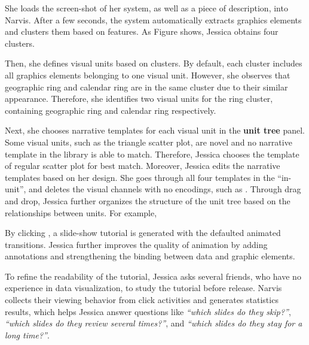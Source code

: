 She loads the screen-shot of her system, as well as a piece of description, into Narvis.
After a few seconds, the system automatically extracts graphics elements and clusters them based on features. As Figure shows, Jessica obtains four clusters. 

Then, she defines visual units based on clusters. By default, each cluster includes all graphics elements belonging to one visual unit. However, she observes that geographic ring and calendar ring are in the same cluster due to their similar appearance. Therefore, she identifies two visual units for the ring cluster, containing geographic ring and calendar ring respectively.

Next, she chooses narrative templates for each visual unit in the \textbf{unit tree} panel. Some visual units, such as the triangle scatter plot, are novel and no narrative template in the library is able to match. Therefore, Jessica chooses the template of regular scatter plot for best match.
Moreover, Jessica edits the narrative templates based on her design. 
She goes through all four templates in the ``in-unit'', and deletes the visual channels with no encodings, such as . 
Through drag and drop, Jessica further organizes the structure of the unit tree based on the relationships between units. For example, 

By clicking , a slide-show tutorial is generated with the defaulted animated transitions. Jessica further improves the quality of animation by adding annotations and strengthening the binding between data and graphic elements. 


To refine the readability of the tutorial, Jessica asks several friends, who have no experience in data visualization, to study the tutorial before release. Narvis collects their viewing behavior from click activities and generates statistics results, which helps Jessica answer questions like \textit{``which slides do they skip?''}, \textit{``which slides do they review several times?''}, and \textit{``which slides do they stay for a long time?''}.





